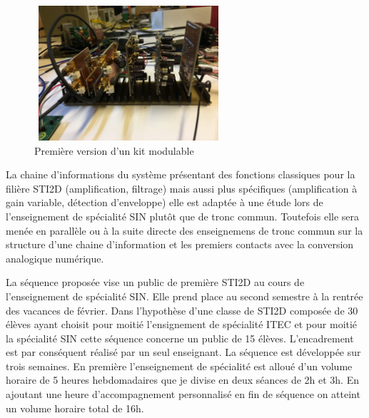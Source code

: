 \documentclass[12pt]{article}
\begin{document}
\begin{figure}
  \vspace{-30pt}
  \hspace{-0pt}
  \begin{center}
    \includegraphics[width=7cm,height=5cm,trim=3cm 19.8cm 10cm 3.3cm, clip=true]{Images_Rapport/stacks}
  \end{center}
  \vspace{-5pt}
  \caption{Première version d'un kit modulable}
  \vspace{-10pt}
\end{figure}

\vspace{30pt}
La chaine d'informations du système présentant des fonctions classiques pour la filière STI2D (amplification, filtrage) mais aussi plus spécifiques (amplification à gain variable, détection d'enveloppe) elle est adaptée à une étude lors de l'enseignement de spécialité SIN plutôt que de tronc commun. Toutefois elle sera menée en parallèle ou à la suite directe des enseignemens de tronc commun sur la structure d'une chaine d'information et les premiers contacts avec la conversion analogique numérique. \par 
\vspace{30pt}

La séquence proposée vise un public de première STI2D au cours de l'enseignement de spécialité SIN. Elle prend place au second semestre à la rentrée des vacances de février. Dans l'hypothèse d'une classe de STI2D composée de 30 élèves ayant choisit pour moitié l'ensignement de spécialité ITEC et pour moitié la spécialité SIN cette séquence concerne un public de 15 élèves. L'encadrement est par conséquent réalisé par un seul enseignant. La séquence est développée sur trois semaines. En première l'enseignement de spécialité est alloué d'un volume horaire de 5 heures hebdomadaires que je divise en deux séances de 2h et 3h. En ajoutant une heure d'accompagnement personnalisé en fin de séquence on atteint un volume horaire total de 16h. \par 
\vspace{10pt}
\end{document}
